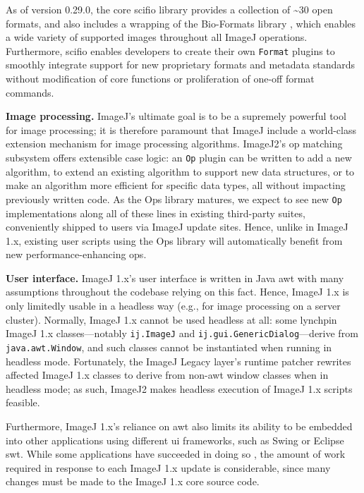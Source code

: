 \documentclass{bmcart}
\begin{document}
As of version 0.29.0, the core \acrshort{scifio} library provides a collection
of \textasciitilde{}30 open formats, and also includes a wrapping of the
Bio-Formats library \cite{bio_formats}, which enables a wide variety of
supported images throughout all ImageJ operations. Furthermore,
\acrshort{scifio} enables developers to create their own \texttt{Format}
plugins to smoothly integrate support for new proprietary formats and metadata
standards without modification of core functions or proliferation of one-off
format commands.

\textbf{Image processing.} ImageJ's ultimate goal is to be a supremely powerful
tool for image processing; it is therefore paramount that ImageJ include a
world-class extension mechanism for image processing algorithms. ImageJ2's op
matching subsystem offers extensible case logic: an \texttt{Op} plugin can be
written to add a new algorithm, to extend an existing algorithm to support new
data structures, or to make an algorithm more efficient for specific data
types, all without impacting previously written code. As the Ops library
matures, we expect to see new \texttt{Op} implementations along all of these
lines in existing third-party suites, conveniently shipped to users via ImageJ
update sites. Hence, unlike in ImageJ 1.x, existing user scripts using the Ops
library will automatically benefit from new performance-enhancing ops.

\textbf{User interface.} ImageJ 1.x's user interface is written in Java
\acrshort{awt} with many assumptions throughout the codebase relying on this
fact. Hence, ImageJ 1.x is only limitedly usable in a headless way (e.g., for
image processing on a server cluster). Normally, ImageJ 1.x cannot be used
headless at all: some lynchpin ImageJ 1.x classes---notably \texttt{ij.ImageJ}
and \texttt{ij.gui.GenericDialog}---derive from \texttt{java.awt.Window}, and
such classes cannot be instantiated when running in headless mode. Fortunately,
the ImageJ Legacy layer's runtime patcher rewrites affected ImageJ 1.x classes
to derive from non-\acrshort{awt} window classes when in headless mode; as
such, ImageJ2 makes headless execution of ImageJ 1.x scripts feasible.

Furthermore, ImageJ 1.x's reliance on \acrshort{awt} also limits its ability to
be embedded into other applications using different \acrshort{ui} frameworks,
such as Swing or Eclipse \acrshort{swt}. While some applications have succeeded
in doing so \cite{bio7}, the amount of work required in response to each ImageJ
1.x update is considerable, since many changes must be made to the ImageJ 1.x
core source code.
\end{document}
